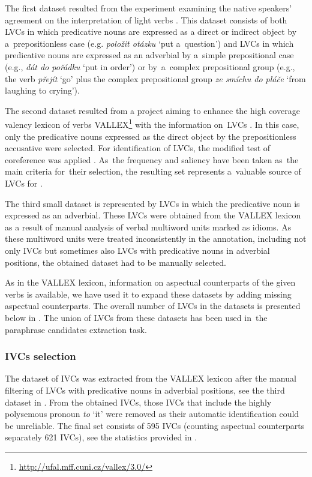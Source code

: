 \documentclass[output=paper,modfonts,nonflat]{langsci/langscibook}
\begin{document}
The first dataset resulted from the experiment examining the native speakers’ 
agreement on the interpretation of light verbs \citep{KeLoCorpusBased2013}. 
This dataset consists of both LVCs in which predicative nouns are expressed as 
a direct or indirect object by a~prepositionless case (e.g. \textit{položit 
otázku} `put a~question') and LVCs in which predicative nouns are expressed 
as an adverbial by a~simple prepositional case (e.g., \textit{dát do pořádku} 
`put in order') or by~a~complex prepositional group (e.g., the verb 
\textit{přejít}  `go' plus the complex prepositional group 
\textit{ze smíchu do pláče} `from laughing to crying'). 

The second dataset resulted from a project aiming to enhance the high coverage
valency lexicon of  verbs VALLEX\footnote{\url{http://ufal.mff.cuni.cz/vallex/3.0/}} 
with the information on~LVCs \citep{KeBaLoLexicographicDescription2016}. 
In this case, only the predicative nouns expressed as the direct object by the 
prepositionless accusative were selected. For identification of LVCs, the 
modified test of coreference was applied \citep{kettnerova-bejcek-2016}. As~the 
frequency and saliency have been taken as~the main criteria for~their 
selection, the resulting set represents a~valuable source of LVCs for . 

The third small dataset is represented by LVCs in which the predicative noun is 
expressed as an adverbial. These LVCs were obtained from the VALLEX lexicon 
as a result of manual analysis of verbal multiword units marked as idioms. As 
these multiword units were treated inconsistently in the annotation, 
including not only IVCs but sometimes also LVCs with predicative nouns in 
adverbial positions, the obtained dataset had to be manually selected.

As in the VALLEX lexicon, information on aspectual counterparts of the given verbs is 
available, we have used it to expand these datasets by adding missing aspectual 
counterparts. The overall number of LVCs in the datasets is presented below in 
. The union of LVCs from these datasets has been used in~the 
paraphrase candidates extraction task.

\subsubsection{IVCs selection}

The dataset of IVCs was extracted from the VALLEX lexicon after the manual
filtering of LVCs with predicative nouns in adverbial positions, see the third
dataset in . From the obtained IVCs, those IVCs 
that include the highly polysemous pronoun \textit{to} `it' were removed 
as their automatic identification could be unreliable. The final set consists of 
595 IVCs (counting aspectual counterparts separately 621 IVCs), see the 
statistics provided in . 
\end{document}
